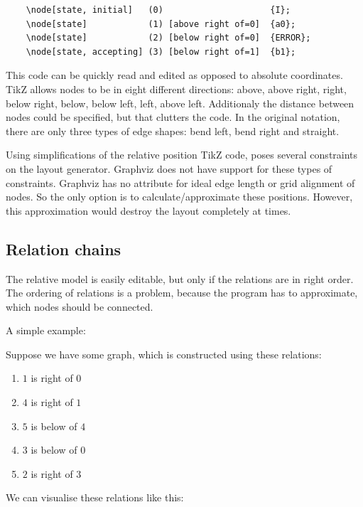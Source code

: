 \documentclass{ctuthesis}
\begin{document}
\begin{verbatim}
	\node[state, initial] 	(0) 					{I};
	\node[state] 			(1) [above right of=0] 	{a0};
	\node[state] 			(2) [below right of=0] 	{ERROR};
	\node[state, accepting] (3) [below right of=1] 	{b1};
\end{verbatim}

This code can be quickly read and edited as opposed to absolute coordinates. TikZ allows nodes to be in eight different directions: above, above right, right, below right, below, below left, left, above left. Additionaly the distance between nodes could be specified, but that clutters the code. In the original notation, there are only three types of edge shapes: bend left, bend right and straight. 

Using simplifications of the relative position TikZ code, poses several constraints on the layout generator. Graphviz does not have support for these types of constraints. Graphviz has no attribute for ideal edge length or grid alignment of nodes. So the only option is to calculate/approximate these positions. However, this approximation would destroy the layout completely at times. 

\subsection{Relation chains}
The relative model is easily editable, but only if the relations are in right order. The ordering of relations is a problem, because the program has to approximate, which nodes should be connected.

A simple example:

Suppose we have some graph, which is constructed using these relations:

\begin{enumerate}
	\item $1$ is right of $0$
	\item $4$ is right of $1$
	\item $5$ is below of $4$
	\item $3$ is below of $0$
	\item $2$ is right of $3$
\end{enumerate}

We can visualise these relations like this:

\begin{figure}[H]
\centering
{}
\end{figure}
\end{document}
